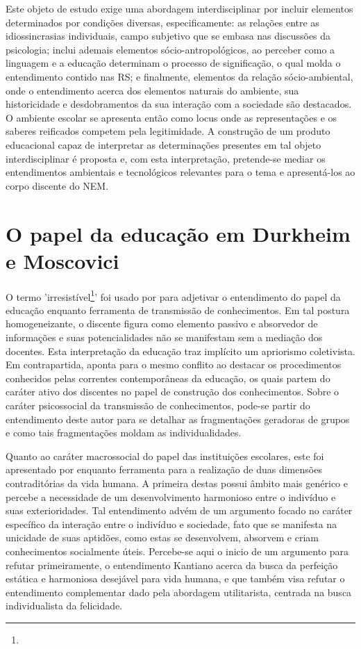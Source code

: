 \documentclass[
  12pt,       %
  openright,      %
  twoside,      %
  a4paper,      %
  english,      %
  french,       %
  spanish,      %
  brazil        %
  ]{abntex2}
\begin{document}
Este objeto de estudo exige uma abordagem interdisciplinar por incluir elementos determinados por condições diversas, especificamente: as relações entre as idiossincrasias individuais, campo subjetivo que se embasa nas discussões da psicologia; inclui ademais elementos sócio-antropológicos, ao perceber como a linguagem e a educação determinam o processo de significação, o qual molda o entendimento contido nas RS; e finalmente, elementos da relação sócio-ambiental, onde o entendimento acerca dos elementos naturais do ambiente, sua historicidade e desdobramentos da sua interação com a sociedade são destacados. O ambiente escolar se apresenta então como locus onde as representações e os saberes reificados competem pela legitimidade. A construção de um produto educacional capaz de interpretar as determinações presentes em tal objeto interdisciplinar é proposta e, com esta interpretação, pretende-se mediar os entendimentos ambientais e tecnológicos relevantes para o tema e apresentá-los ao corpo discente do NEM.




\chapter{O papel da educação em Durkheim e Moscovici}


O termo ’irresistível\footnote{}’ foi usado por  para adjetivar o entendimento do papel da educação enquanto ferramenta de transmissão de conhecimentos. Em tal
postura homogeneizante, o discente figura como elemento passivo e absorvedor de informações e suas potencialidades não se manifestam sem a mediação dos docentes. Esta interpretação da educação traz implícito um apriorismo coletivista. Em contrapartida,  aponta para o mesmo conflito ao destacar os procedimentos conhecidos pelas correntes contemporâneas da educação, os quais
partem do caráter ativo dos discentes no papel de construção dos conhecimentos. Sobre o caráter psicossocial da transmissão de conhecimentos, pode-se partir do entendimento deste autor para se detalhar as fragmentações geradoras de grupos e como tais fragmentações moldam as individualidades. 

Quanto ao caráter macrossocial do papel das instituições escolares, este foi apresentado por  enquanto ferramenta para a realização de duas dimensões contraditórias da vida humana. A primeira destas possui âmbito mais genérico e percebe a necessidade de um desenvolvimento harmonioso entre o indivíduo e suas exterioridades. Tal entendimento advém de um argumento focado no caráter específico da interação entre o indivíduo e sociedade, fato que se manifesta na unicidade de suas aptidões, como estas se desenvolvem, absorvem e criam conhecimentos socialmente úteis. Percebe-se aqui o inicio de um argumento para refutar primeiramente, o entendimento Kantiano acerca da busca da perfeição estática e harmoniosa desejável para vida humana, e que também visa refutar o entendimento complementar dado pela abordagem utilitarista, centrada na busca individualista da felicidade. 
\end{document}

